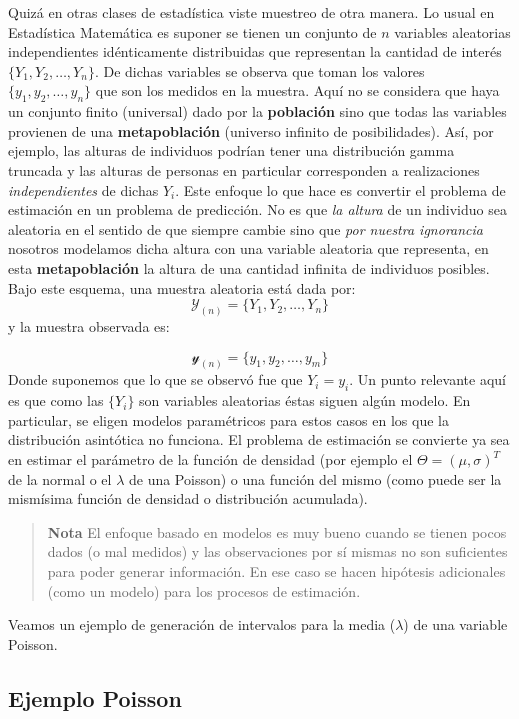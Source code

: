 \documentclass[
]{book}
\begin{document}
Quizá en otras clases de estadística viste muestreo de otra manera. Lo usual en Estadística Matemática es suponer se tienen un conjunto de \(n\) variables aleatorias independientes idénticamente distribuidas que representan la cantidad de interés \(\{ Y_1, Y_2, \dots, Y_n\}\). De dichas variables se observa que toman los valores \(\{y_1, y_2, \dots, y_n\}\) que son los medidos en la muestra. Aquí no se considera que haya un conjunto finito (universal) dado por la \textbf{población} sino que todas las variables provienen de una \textbf{metapoblación} (universo infinito de posibilidades). Así, por ejemplo, las alturas de individuos podrían tener una distribución gamma truncada y las alturas de personas en particular corresponden a realizaciones \emph{independientes} de dichas \(Y_i\). Este enfoque lo que hace es convertir el problema de estimación en un problema de predicción. No es que \emph{la altura} de un individuo sea aleatoria en el sentido de que siempre cambie sino que \emph{por nuestra ignorancia} nosotros modelamos dicha altura con una variable aleatoria que representa, en esta \textbf{metapoblación} la altura de una cantidad infinita de individuos posibles. Bajo este esquema, una muestra aleatoria está dada por:
\[
\mathcal{Y}_{(n)} = \{ Y_1, Y_2, \dots, Y_n\}
\]
y la muestra observada es:

\[
\mathcal{y}_{(n)} = \{ y_1, y_2, \dots, y_m\}
\]
Donde suponemos que lo que se observó fue que \(Y_i = y_i\). Un punto relevante aquí es que como las \(\{Y_i\}\) son variables aleatorias éstas siguen algún modelo. En particular, se eligen modelos paramétricos para estos casos en los que la distribución asintótica no funciona. El problema de estimación se convierte ya sea en estimar el parámetro de la función de densidad (por ejemplo el \(\Theta = (\mu,\sigma)^T\) de la normal o el \(\lambda\) de una Poisson) o una función del mismo (como puede ser la mismísima función de densidad o distribución acumulada).

\begin{quote}
\textbf{Nota} El enfoque basado en modelos es muy bueno cuando se tienen pocos dados (o mal medidos) y las observaciones por sí mismas no son suficientes para poder generar información. En ese caso se hacen hipótesis adicionales (como un modelo) para los procesos de estimación.
\end{quote}

Veamos un ejemplo de generación de intervalos para la media (\(\lambda\)) de una variable Poisson.

\hypertarget{ejemplo-poisson}{%
\subsection{Ejemplo Poisson}\label{ejemplo-poisson}}
\end{document}
